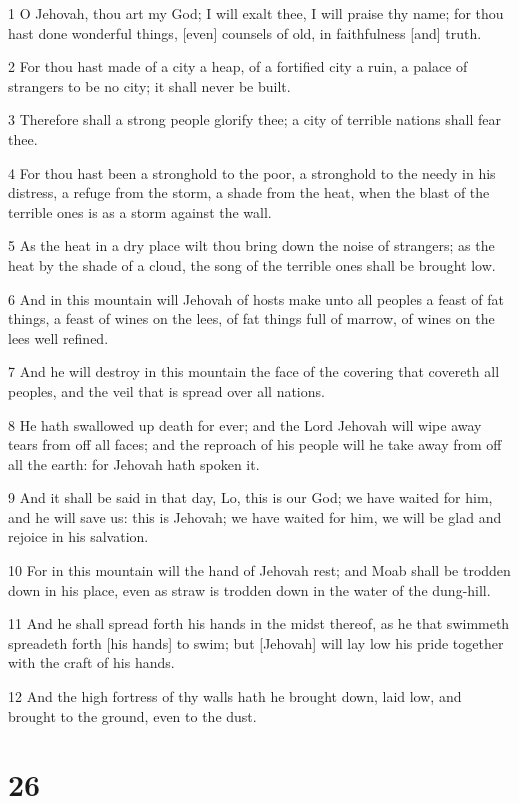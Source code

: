 \par 1 O Jehovah, thou art my God; I will exalt thee, I will praise thy name; for thou hast done wonderful things, [even] counsels of old, in faithfulness [and] truth.
\par 2 For thou hast made of a city a heap, of a fortified city a ruin, a palace of strangers to be no city; it shall never be built.
\par 3 Therefore shall a strong people glorify thee; a city of terrible nations shall fear thee.
\par 4 For thou hast been a stronghold to the poor, a stronghold to the needy in his distress, a refuge from the storm, a shade from the heat, when the blast of the terrible ones is as a storm against the wall.
\par 5 As the heat in a dry place wilt thou bring down the noise of strangers; as the heat by the shade of a cloud, the song of the terrible ones shall be brought low.
\par 6 And in this mountain will Jehovah of hosts make unto all peoples a feast of fat things, a feast of wines on the lees, of fat things full of marrow, of wines on the lees well refined.
\par 7 And he will destroy in this mountain the face of the covering that covereth all peoples, and the veil that is spread over all nations.
\par 8 He hath swallowed up death for ever; and the Lord Jehovah will wipe away tears from off all faces; and the reproach of his people will he take away from off all the earth: for Jehovah hath spoken it.
\par 9 And it shall be said in that day, Lo, this is our God; we have waited for him, and he will save us: this is Jehovah; we have waited for him, we will be glad and rejoice in his salvation.
\par 10 For in this mountain will the hand of Jehovah rest; and Moab shall be trodden down in his place, even as straw is trodden down in the water of the dung-hill.
\par 11 And he shall spread forth his hands in the midst thereof, as he that swimmeth spreadeth forth [his hands] to swim; but [Jehovah] will lay low his pride together with the craft of his hands.
\par 12 And the high fortress of thy walls hath he brought down, laid low, and brought to the ground, even to the dust.

\chapter{26}

